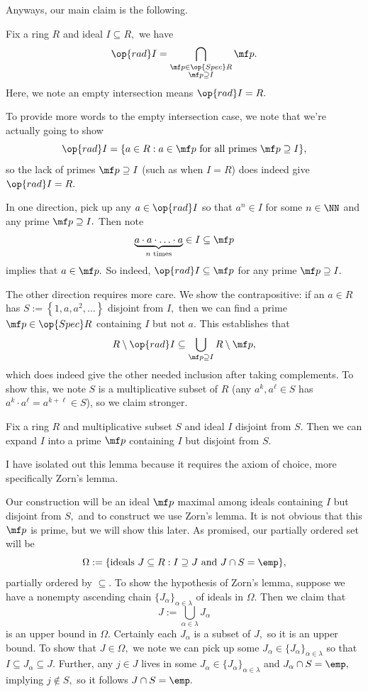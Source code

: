 Anyways, our main claim is the following.
\begin{proposition}
    Fix a ring $R$ and ideal $I\subseteq R,$ we have
    \[\op{rad}I=\bigcap_{\substack{\mf p\in\op{Spec}R\\\mf p\supseteq I}}\mf p.\]
    Here, we note an empty intersection means $\op{rad}I=R.$
\end{proposition}
To provide more words to the empty intersection case, we note that we're actually going to show
\[\op{rad}I=\{a\in R:a\in\mf p\text{ for all primes }\mf p\supseteq I\},\]
so the lack of primes $\mf p\supseteq I$ (such as when $I=R$) does indeed give $\op{rad}I=R.$

In one direction, pick up any $a\in\op{rad}I$ so that $a^n\in I$ for some $n\in\NN$ and any prime $\mf p\supseteq I.$ Then note
\[\underbrace{a\cdot a\cdot\ldots\cdot a}_{n\text{ times}}\in I\subseteq\mf p\]
implies that $a\in\mf p.$ So indeed, $\op{rad}I\subseteq\mf p$ for any prime $\mf p\supseteq I.$

The other direction requires more care. We show the contrapositive: if an $a\in R$ has $S:=\left\{1,a,a^2,\ldots\right\}$ disjoint from $I,$ then we can find a prime $\mf p\in\op{Spec}R$ containing $I$ but not $a.$ This establishes that
\[R\setminus\op{rad}I\subseteq\bigcup_{\mf p\supseteq I}R\setminus\mf p,\]
which does indeed give the other needed inclusion after taking complements. To show this, we note $S$ is a multiplicative subset of $R$ (any $a^k,a^\ell\in S$ has $a^k\cdot a^\ell=a^{k+\ell}\in S$), so we claim stronger.
\begin{lemma}
    Fix a ring $R$ and multiplicative subset $S$ and ideal $I$ disjoint from $S.$ Then we can expand $I$ into a prime $\mf p$ containing $I$ but disjoint from $S.$
\end{lemma}
I have isolated out this lemma because it requires the axiom of choice, more specifically Zorn's lemma.

Our construction will be an ideal $\mf p$ maximal among ideals containing $I$ but disjoint from $S,$ and to construct we use Zorn's lemma. It is not obvious that this $\mf p$ is prime, but we will show this later. As promised, our partially ordered set will be
\[\Omega:=\{\text{ideals }J\subseteq R:I\supseteq J\text{ and }J\cap S=\emp\},\]
partially ordered by $\subseteq.$ To show the hypothesis of Zorn's lemma, suppose we have a nonempty ascending chain $\{J_\alpha\}_{\alpha\in\lambda}$ of ideals in $\Omega.$ Then we claim that
\[J:=\bigcup_{\alpha\in\lambda}J_\alpha\]
is an upper bound in $\Omega.$ Certainly each $J_\alpha$ is a subset of $J,$ so it is an upper bound. To show that $J\in\Omega,$ we note we can pick up some $J_\alpha\in\{J_\alpha\}_{\alpha\in\lambda}$ so that $I\subseteq J_\alpha\subseteq J.$ Further, any $j\in J$ lives in some $J_\alpha\in\{J_\alpha\}_{\alpha\in\lambda}$ and $J_\alpha\cap S=\emp,$ implying $j\not\in S,$ so it follows $J\cap S=\emp.$

